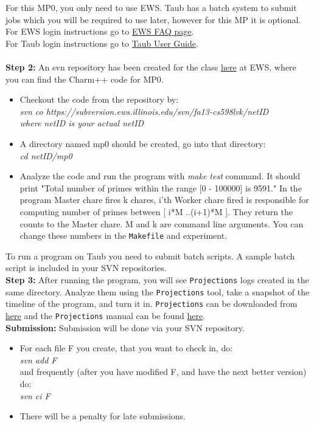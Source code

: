 \documentclass{article}
\begin{document}
For this MP0, you only need to use EWS. Taub has a batch
system to submit jobs which you will be required to use later, however for this MP
it is optional.\\
For EWS login instructions go to
\href{http://it.engineering.illinois.edu/ews/lab-information/ews-faq}{EWS FAQ page}.\\
For Taub login instructions go to
\href{https://campuscluster.illinois.edu/user\_info/doc/}{Taub User Guide}.\\
\\
\textbf{Step 2:} An svn repository has been created for the class
\href{https://subversion.ews.illinois.edu/svn/fa13-cs598lvk/}{here} at EWS, where you can find the Charm++ code for MP0. \\
\begin{itemize}
\item Checkout the code from the repository by: \\
        \textit{svn co
        https://subversion.ews.illinois.edu/svn/fa13-cs598lvk/netID \\
        where netID is your actual netID}
\item A directory named mp0 should be created, go into that directory: \\
        \textit{cd netID/mp0}
\item Analyze the code and run the program with \textit{make test} command.
It should print "Total number of primes within the range [0 - 100000] is 9591." In the program Master chare fires k chares, i'th Worker chare fired is responsible for
computing number of primes between [ i*M ..(i+1)*M ]. They return the counts to
the Master chare. M and k are command line arguments. You can change these numbers in the \texttt{Makefile} and experiment.

\end{itemize}
    To run a program on Taub you need to submit batch scripts.
    A sample batch script is included in your SVN repositories.\\

\textbf{Step 3:}  After running the program, you will see \texttt{Projections}
logs created in the same directory.
Analyze them using the \texttt{Projections} tool,
take a snapshot of the timeline of the program, and turn it in.
\texttt{Projections} can be downloaded from \href{http://charm.cs.uiuc.edu/software}{here} and the
\texttt{Projections} manual can be found
\href{http://charm.cs.illinois.edu/manuals/html/projections/manual-1p.html}
{here}.\\

\textbf{Submission:}
Submission will be done via your SVN repository.
\begin{itemize}
\item  For each file F you create, that you want to check in, do: \\
        \textit{svn add F}\\
        and frequently (after you have modified F, and have the next better
        version) do:\\ 
        \textit{svn ci F}
\item  There will be a penalty for late submissions.
\end{itemize}
\end{document}

